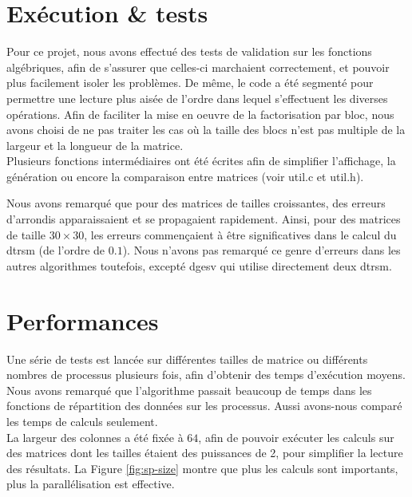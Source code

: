 \section{Exécution \& tests} %
\label{sec:execution}

Pour ce projet, nous avons effectué des tests de validation sur les fonctions algébriques, afin de s'assurer que celles-ci marchaient correctement, et pouvoir plus facilement isoler les problèmes. De même, le code a été segmenté pour permettre une lecture plus aisée de l'ordre dans lequel s'effectuent les diverses opérations. Afin de faciliter la mise en oeuvre de la factorisation par bloc, nous avons choisi de ne pas traiter les cas où la taille des blocs n'est pas multiple de la largeur et la longueur de la matrice.\\

Plusieurs fonctions intermédiaires ont été écrites afin de simplifier l'affichage, la génération ou encore la comparaison entre matrices (voir util.c et util.h).

Nous avons remarqué que pour des matrices de tailles croissantes, des erreurs d'arrondis apparaissaient et se propagaient rapidement. Ainsi, pour des matrices de taille $30 \times 30$, les erreurs commençaient à être significatives dans le calcul du dtrsm (de l'ordre de $0.1$). Nous n'avons pas remarqué ce genre d'erreurs dans les autres algorithmes toutefois, excepté dgesv qui utilise directement deux dtrsm. 

\section{Performances} %
\label{sec:perf}

Une série de tests est lancée sur différentes tailles de matrice ou différents nombres de processus plusieurs fois, afin d'obtenir des temps d'exécution moyens. Nous avons remarqué que l'algorithme passait beaucoup de temps dans les fonctions de répartition des données sur les processus. Aussi avons-nous comparé les temps de calculs seulement. \\
La largeur des colonnes a été fixée à $64$, afin de pouvoir exécuter les calculs sur des matrices dont les tailles étaient des puissances de 2, pour simplifier la lecture des résultats. 
La Figure \ref{fig:sp-size} montre que plus les calculs sont importants, plus la parallélisation est effective.

